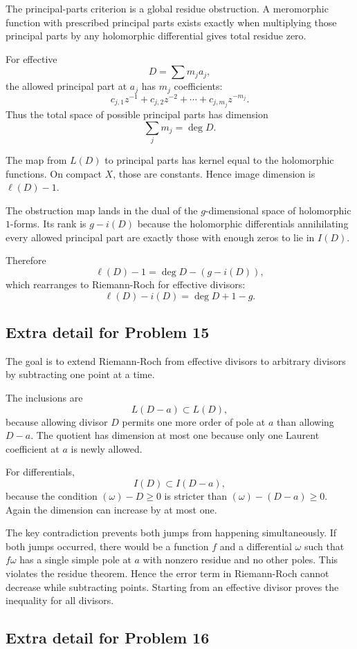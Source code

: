 \documentclass[11pt]{article}
\begin{document}
The principal-parts criterion is a global residue obstruction. A meromorphic function with prescribed principal parts exists exactly when multiplying those principal parts by any holomorphic differential gives total residue zero.

For effective
\[
 D=\sum m_j a_j,
\]
the allowed principal part at $a_j$ has $m_j$ coefficients:
\[
 c_{j,1}z^{-1}+c_{j,2}z^{-2}+\cdots+c_{j,m_j}z^{-m_j}.
\]
Thus the total space of possible principal parts has dimension
\[
 \sum_jm_j=\deg D.
\]

The map from $L(D)$ to principal parts has kernel equal to the holomorphic functions. On compact $X$, those are constants. Hence image dimension is $\ell(D)-1$.

The obstruction map lands in the dual of the $g$-dimensional space of holomorphic $1$-forms. Its rank is $g-i(D)$ because the holomorphic differentials annihilating every allowed principal part are exactly those with enough zeros to lie in $I(D)$.

Therefore
\[
 \ell(D)-1=\deg D-(g-i(D)),
\]
which rearranges to Riemann-Roch for effective divisors:
\[
 \ell(D)-i(D)=\deg D+1-g.
\]

\subsection*{Extra detail for Problem 15}

The goal is to extend Riemann-Roch from effective divisors to arbitrary divisors by subtracting one point at a time.

The inclusions are
\[
 L(D-a)\subset L(D),
\]
because allowing divisor $D$ permits one more order of pole at $a$ than allowing $D-a$.
The quotient has dimension at most one because only one Laurent coefficient at $a$ is newly allowed.

For differentials,
\[
 I(D)\subset I(D-a),
\]
because the condition $(\omega)-D\geq0$ is stricter than $(\omega)-(D-a)\geq0$.
Again the dimension can increase by at most one.

The key contradiction prevents both jumps from happening simultaneously. If both jumps occurred, there would be a function $f$ and a differential $\omega$ such that $f\omega$ has a single simple pole at $a$ with nonzero residue and no other poles. This violates the residue theorem. Hence the error term in Riemann-Roch cannot decrease while subtracting points. Starting from an effective divisor proves the inequality for all divisors.

\subsection*{Extra detail for Problem 16}
\end{document}
